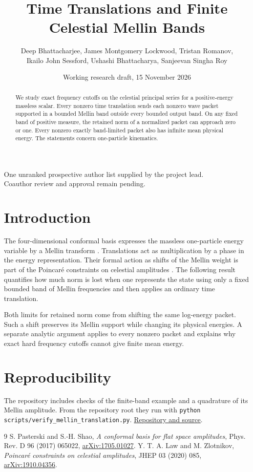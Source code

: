 \documentclass[11pt]{article}
\title{Time Translations and Finite Celestial Mellin Bands}
\author{\normalsize Deep Bhattacharjee, James Montgomery Lockwood, Tristan Romanov,\\
\normalsize Ikailo John Sessford, Ushashi Bhattacharya, Sanjeevan Singha Roy}
\date{Working research draft, 15 November 2026}
\begin{document}
\maketitle
\begin{center}\small\color{teal!70!black}
One unranked prospective author list supplied by the project lead.\\
Coauthor review and approval remain pending.
\end{center}
\begin{abstract}
We study exact frequency cutoffs on the celestial principal series
for a positive-energy massless scalar. Every nonzero time translation
sends each nonzero wave packet supported in a bounded Mellin band
outside every bounded output band. On any fixed band of positive
measure, the retained norm of a normalized packet can approach zero
or one. Every nonzero exactly band-limited packet also has infinite
mean physical energy. The statements concern one-particle kinematics.
\end{abstract}

\section{Introduction}
The four-dimensional conformal basis expresses the massless
one-particle energy variable by a Mellin transform \cite{basis}.
Translations act as multiplication by a phase in the energy
representation. Their formal action as shifts of the Mellin weight is
part of the Poincar\'e constraints on celestial amplitudes
\cite{lawzlotnikov}. The following result quantifies how much norm is
lost when one represents the state using only a fixed bounded band
of Mellin frequencies and then applies an ordinary time translation.

Both limits for retained norm come from shifting the same
log-energy packet. Such a shift preserves its Mellin support while
changing its physical energies. A separate analytic argument applies
to every nonzero packet and explains why exact hard frequency
cutoffs cannot give finite mean energy.



\section*{Reproducibility}
The repository includes checks of the finite-band example and a
quadrature of its Mellin amplitude. From the repository root they run
with \texttt{python scripts/verify\_mellin\_translation.py}.
\href{https://github.com/anaxia-research/celestial-infrared-stability}{Repository and source}.

\begin{thebibliography}{9}
 S. Pasterski and S.-H. Shao,
\emph{A conformal basis for flat space amplitudes},
Phys. Rev. D 96 (2017) 065022,
\href{https://arxiv.org/abs/1705.01027}{arXiv:1705.01027}.
 Y. T. A. Law and M. Zlotnikov,
\emph{Poincar\'e constraints on celestial amplitudes},
JHEP 03 (2020) 085,
\href{https://arxiv.org/abs/1910.04356}{arXiv:1910.04356}.
\end{thebibliography}
\end{document}
